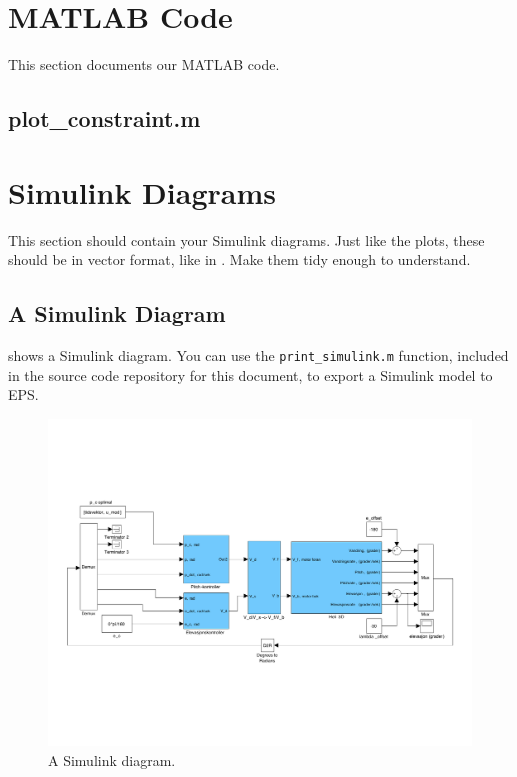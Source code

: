 \appendix

\section{MATLAB Code}\label{sec:matlab}
This section documents our MATLAB code.

\subsection{plot\_constraint.m}\label{sec:plot_constraint_m}
\section{Simulink Diagrams}\label{sec:simulink}
This section should contain your Simulink diagrams. Just like the plots, these should be in vector format, like in . Make them tidy enough to understand.

\subsection{A Simulink Diagram}
 shows a Simulink diagram. You can use the \texttt{print\_simulink.m} function, included in the source code repository for this document, to export a Simulink model to EPS\@.
\begin{figure}[htb]
	\centering
		\includegraphics[width = \textwidth]{figures/simulink.pdf}
	\caption{A Simulink diagram.}
\label{fig:simulink}
\end{figure}
